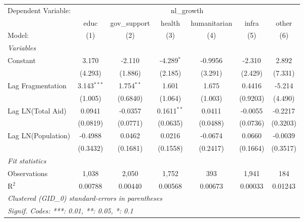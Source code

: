 \begingroup
\centering
\begin{tabular}{lcccccc}
   \tabularnewline \midrule \midrule
   Dependent Variable: & \multicolumn{6}{c}{nl\_growth}\\
                      & educ          & gov\_support  & health        & humanitarian & infra    & other \\   
   Model:             & (1)           & (2)           & (3)           & (4)          & (5)      & (6)\\  
   \midrule
   \emph{Variables}\\
   Constant           & 3.170         & -2.110        & -4.289$^{*}$  & -0.9956      & -2.310   & 2.892\\   
                      & (4.293)       & (1.886)       & (2.185)       & (3.291)      & (2.429)  & (7.331)\\   
   Lag Fragmentation  & 3.143$^{***}$ & 1.754$^{**}$  & 1.601         & 1.675        & 0.4416   & -5.214\\   
                      & (1.005)       & (0.6840)      & (1.064)       & (1.003)      & (0.9203) & (4.490)\\   
   Lag LN(Total Aid)  & 0.0941        & -0.0357       & 0.1611$^{**}$ & 0.0411       & -0.0055  & -0.2217\\   
                      & (0.0819)      & (0.0771)      & (0.0635)      & (0.0488)     & (0.0736) & (0.3203)\\   
   Lag LN(Population) & -0.4988       & 0.0462        & 0.0216        & -0.0674      & 0.0660   & -0.0039\\   
                      & (0.3432)      & (0.1681)      & (0.1558)      & (0.2417)     & (0.1664) & (0.3517)\\   
   \midrule
   \emph{Fit statistics}\\
   Observations       & 1,038         & 2,050         & 1,752         & 393          & 1,941    & 184\\  
   R$^2$              & 0.00788       & 0.00440       & 0.00568       & 0.00673      & 0.00033  & 0.01243\\  
   \midrule \midrule
   \multicolumn{7}{l}{\emph{Clustered (GID\_0) standard-errors in parentheses}}\\
   \multicolumn{7}{l}{\emph{Signif. Codes: ***: 0.01, **: 0.05, *: 0.1}}\\
\end{tabular}
\par\endgroup



